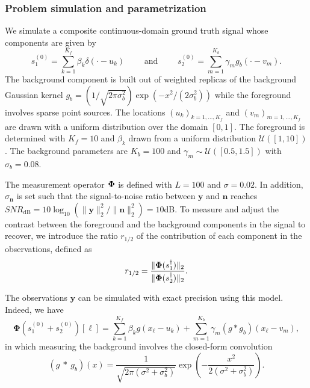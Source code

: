         \subsubsection{Problem simulation and parametrization}

            We simulate a composite continuous-domain ground truth signal whose components are given by 
            $$s_1^{(0)} = \sum_{k=1}^{K_f} \beta_ k \delta(\cdot - u_k) \qquad\text{ and }\qquad s_2^{(0)} = \sum_{m=1}^{K_b} \gamma_m g_b(\cdot - v_m).
            $$
            The background component is built out of weighted replicas of the background Gaussian kernel $g_b = (1/\sqrt{2\pi\sigma_b^2}) \exp{(-x^2/(2 \sigma_b^2))}$ while the foreground involves sparse point sources. The locations $(u_k)_{k=1, \dots, K_f}$ and $(v_m)_{m=1, \dots, K_f}$ are drawn with a uniform distribution over the domain $[0, 1]$. The foreground is determined with $K_f = 10$ and $\beta_k$ drawn from a uniform distribution $\mathcal{U}([1, 10])$. The background parameters are $K_b = 100$ and $\gamma_m \sim \mathcal{U}([0.5, 1.5])$ with $\sigma_b = 0.08$.
            
            The measurement operator $\bm{\Phi}$ is defined with $L=100$ and $\sigma=0.02$. In addition, $\sigma_{\bm{n}}$ is set such that the signal-to-noise ratio between $\bm{y}$ and $\bm{n}$ reaches $SNR_\mathrm{dB} = 10 \log_{10}\left({\lVert \bm{y} \rVert_2^2}/{\lVert \bm{n} \rVert_2^2}\right) = 10$dB. To measure and adjust the contrast between the foreground and the background components in the signal to recover, we introduce the ratio $r_{1/2}$ of the contribution of each component in the observations, defined as
            \begin{equation}
                r_{1/2} = \frac{\lVert \bm{\Phi} (s_1^\dagger) \rVert_2 }{\lVert \bm{\Phi} (s_2^\dagger) \rVert_2 }.
            \end{equation}
    
            The observations $\bm{y}$ can be simulated with exact precision using this model. Indeed, we have
            $$
            \bm{\Phi}(s_1^{(0)} + s_2^{(0)})[\ell] = \sum_{k=1}^{K_f} \beta_k g(x_\ell - u_k) + \sum_{m=1}^{K_b} \gamma_m (g * g_b)(x_\ell - v_m),
            $$
            in which measuring the background involves the closed-form convolution
            $$
            (g\ *\ g_b)(x) = \frac{1}{\sqrt{2 \pi(\sigma^2 + \sigma_b^2)}} \exp{\left(-\frac{x^2}{2 (\sigma^2 + \sigma_b^2)}\right)}.
            $$
            
